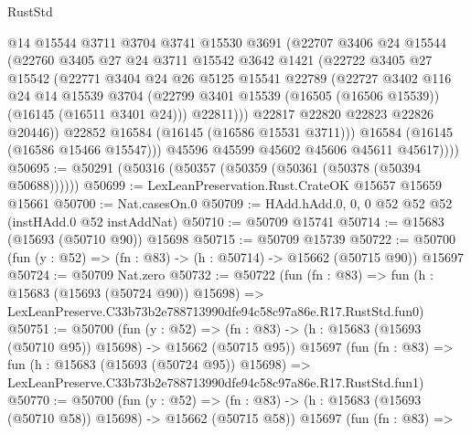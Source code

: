 \begin{lexlean}{RustStd}
\begin{coremodule}
                @14
                @15544
                @3711
                @3704
                @3741
                @15530
                @3691
                (@22707
                  @3406
                  @24
                  @15544
                  (@22760
                    @3405
                    @27
                    @24
                    @3711
                    @15542
                    @3642
                    @1421
                    (@22722
                      @3405
                      @27
                      @15542
                      (@22771
                        @3404
                        @24
                        @26
                        @5125
                        @15541
                        @22789
                        (@22727
                          @3402
                          @116
                          @24
                          @14
                          @15539
                          @3704
                          (@22799 @3401 @15539 (@16505 (@16506 @15539)) (@16145 (@16511 @3401 @24)))
                          @22811)))
                    @22817
                    @22820
                    @22823
                    @22826
                    @20446))
                @22852
                @16584
                (@16145 (@16586 @15531 @3711)))
              @16584
              (@16145 (@16586 @15466 @15547)))
            @45596
            @45599
            @45602
            @45606
            @45611
            @45617))))
@50695 := @50291 (@50316 (@50357 (@50359 (@50361 (@50378 (@50394 @50688))))))
@50699 := LexLeanPreservation.Rust.CrateOK @15657 @15659 @15661
@50700 := Nat.casesOn.{0}
@50709 := HAdd.hAdd.{0, 0, 0} @52 @52 @52 (instHAdd.{0} @52 instAddNat)
@50710 := @50709 @15741
@50714 := @15683 (@15693 (@50710 @90)) @15698
@50715 := @50709 @15739
@50722 := @50700 (fun (y : @52) => (fn : @83) -> (h : @50714) -> @15662 (@50715 @90)) @15697
@50724 := @50709 Nat.zero
@50732 := @50722
    (fun (fn : @83) =>
    fun (h : @15683 (@15693 (@50724 @90)) @15698) =>
    LexLeanPreserve.C33b73b2e788713990dfe94c58c97a86e.R17.RustStd.fun0)
@50751 := @50700
    (fun (y : @52) =>
    (fn : @83) -> (h : @15683 (@15693 (@50710 @95)) @15698) -> @15662 (@50715 @95))
    @15697
    (fun (fn : @83) =>
    fun (h : @15683 (@15693 (@50724 @95)) @15698) =>
    LexLeanPreserve.C33b73b2e788713990dfe94c58c97a86e.R17.RustStd.fun1)
@50770 := @50700
    (fun (y : @52) =>
    (fn : @83) -> (h : @15683 (@15693 (@50710 @58)) @15698) -> @15662 (@50715 @58))
    @15697
    (fun (fn : @83) =>

\end{coremodule}
\end{lexlean}
